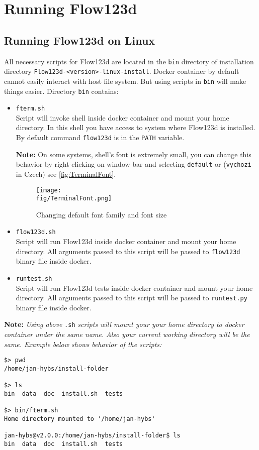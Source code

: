 \section{Running Flow123d}
\subsection{Running Flow123d on Linux}
\label{subsec:running-flow123d-on-linux}
All necessary scripts for Flow123d are located in the \verb'bin' directory of installation directory \verb'Flow123d-<version>-linux-install'.
Docker container by default cannot easily interact with host file system. But using scripts in \verb'bin' will make things easier.
Directory \verb'bin' contains:
\begin{itemize}
	\item \verb'fterm.sh' \\
	 Script will invoke shell inside docker container and mount your home directory.
	 In this shell you have access to system where Flow123d is installed. By default command \verb'flow123d' is in the \verb'PATH' variable.
	 
	\textbf{Note:} On some systems, shell's font is extremely small, you can change this behavior by right-clicking on window bar and selecting 
	\verb'default' or (\verb'vychozi' in Czech) see \autoref{fig:TerminalFont}.
	 \begin{figure}
		 \center
		 \texttt{[image: \\fig/TerminalFont.png]}
		 \caption{Changing default font family and font size}
		 \label{fig:TerminalFont}
	 \end{figure}

	\item \verb'flow123d.sh' \\
	 Script will run Flow123d inside docker container and mount your home  directory.
	 All arguments passed to this script will be passed to \verb'flow123d' binary file inside docker.

	\item \verb'runtest.sh' \\
	 Script will run Flow123d tests inside docker container and mount your home  directory.
	 All arguments passed to this script will be passed to \verb'runtest.py' binary file inside docker.
\end{itemize}

\textbf{Note:}
\textit{Using above} \verb'.sh' \textit{scripts will mount your your home directory to docker container under the same name.}
\textit{Also your current working directory will be the same. Example below shows behavior of the scripts:}
\begin{verbatim}
$> pwd
/home/jan-hybs/install-folder

$> ls
bin  data  doc	install.sh  tests

$> bin/fterm.sh
Home directory mounted to '/home/jan-hybs'

jan-hybs@v2.0.0:/home/jan-hybs/install-folder$ ls
bin  data  doc	install.sh  tests
\end{verbatim}


